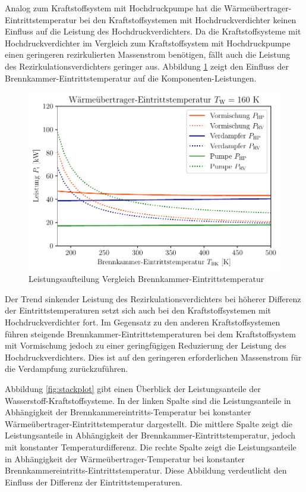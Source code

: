 Analog zum Kraftstoffsystem mit Hochdruckpumpe hat die Wärmeübertrager-Eintrittstemperatur bei den Kraftstoffsystemen mit Hochdruckverdichter keinen Einfluss auf die Leistung des Hochdruckverdichters. Da die Kraftstoffsysteme mit Hochdruckverdichter im Vergleich zum Kraftstoffsystem mit Hochdruckpumpe einen geringeren rezirkulierten Massenstrom benötigen, fällt auch die Leistung des Rezirkulationsverdichters geringer aus. Abbildung \ref{fig:tbk_split} zeigt den Einfluss der Brennkammer-Eintrittstemperatur auf die Komponenten-Leistungen.

\begin{figure}[ht]
\centering
\includegraphics[width=0.9\linewidth]{4_Abbildungen/2_Hauptteil/Ergebnisse/tbkcomp.pdf}
  \caption{Leistungsaufteilung Vergleich Brennkammer-Eintrittstemperatur}
  \label{fig:tbk_split}
\end{figure}
\FloatBarrier

Der Trend sinkender Leistung des Rezirkulationsverdichters bei höherer Differenz der Eintrittstemperaturen setzt sich auch bei den Kraftstoffsystemen mit Hochdruckverdichter fort. Im Gegensatz zu den anderen Kraftstoffsystemen führen steigende Brennkammer-Eintrittstemperaturen bei dem Kraftstoffsystem mit Vormischung jedoch zu einer geringfügigen Reduzierung der Leistung des Hochdruckverdichters. Dies ist auf den geringeren erforderlichen Massenstrom für die Verdampfung zurückzuführen. 

Abbildung \ref{fig:stackplot} gibt einen Überblick der Leistungsanteile der Wasserstoff-Kraftstoffsysteme. In der linken Spalte sind die Leistungsanteile in Abhängigkeit der Brennkammereintritts-Temperatur bei konstanter Wärmeübertrager-Eintrittstemperatur dargestellt. Die mittlere Spalte zeigt die Leistungsanteile in Abhängigkeit der Brennkammer-Eintrittstemperatur, jedoch mit konstanter Temperaturdifferenz. Die rechte Spalte zeigt die Leistungsanteile in Abhängigkeit der Wärmeübertrager-Temperatur bei konstanter Brennkammereintritts-Eintrittstemperatur. Diese Abbildung verdeutlicht den Einfluss der Differenz der Eintrittstemperaturen. 

